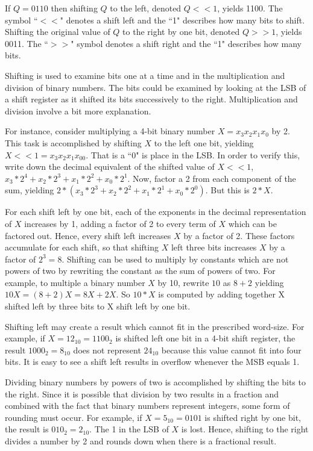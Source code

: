 If $Q=0110$ then shifting $Q$ to the left, denoted $Q<<1$,
yields 1100.  The symbol ``$<<$" denotes a shift left and the ``1"
describes how many bits to shift.  Shifting the original
value of $Q$ to the right by one bit, denoted $Q>>1$, yields
0011.  The ``$>>$" symbol denotes a shift right and the ``1"
describes how many bits.

Shifting is used to examine bits one at a time and in the
multiplication and division of binary numbers.  The bits
could be examined by looking at the LSB of a shift register
as it shifted its bits successively to the right.
Multiplication and division involve a bit more explanation.

For instance, consider multiplying a 4-bit binary number
$X=x_3 x_2 x_1 x_0$  by 2.  This task is accomplished by shifting
$X$ to the left one bit, yielding $X<<1=x_3 x_2 x_1 x_00$.  That
is a ``0" is place in the LSB.
In order to verify this, write down the decimal equivalent of
the shifted value of $X<<1$, $x_3*2^4 +x_2*2^3 +x_1*2^2 +x_0*2^1$.
Now, factor a 2 from each component of the sum, yielding
$2*(x_3*2^3 +x_2*2^2 +x_1*2^1 +x_0*2^0)$.  But this is $2*X$.

For each shift left by one bit, each of the exponents in the
decimal representation of $X$ increases by 1, adding a factor of
2 to every term of $X$ which can be factored out.  Hence, every
shift left increases $X$ by a factor of 2.  These factors
accumulate for each shift, so that shifting $X$ left three bits
increases $X$ by a factor of $2^3=8$.  Shifting can be used to
multiply by constants which are not powers of two by rewriting the
constant as the sum of powers of two.  For example, \label{page:MulyBy10}
to multiple a binary number $X$ by 10, rewrite $10$
as $8+2$ yielding $10X = (8+2)X = 8X+2X$.  So $10*X$ is computed
by adding together X shifted left by three bits to X shift left by one bit.

Shifting left may create a result
which cannot fit in the prescribed word-size.  For example, if
$X=12_{10}=1100_2$ is shifted left one bit in a 4-bit shift register,
the result $1000_2 = 8_{10}$ does not represent $24_{10}$ because
this value cannot fit into four bits.  It is easy to see a shift left
results in overflow whenever the MSB equals 1.

Dividing binary numbers by powers of two is accomplished by
shifting the bits to the right.  Since it is possible that division by
two results in a fraction and combined with the fact that binary numbers
represent integers, some form of rounding must occur.  For example,
if $X=5_{10}=0101$ is shifted right by one bit, the result is
$010_2=2_{10}$.  The 1 in the LSB of $X$ is lost.  Hence, shifting
to the right divides a number by 2 and rounds down when there
is a fractional result.

